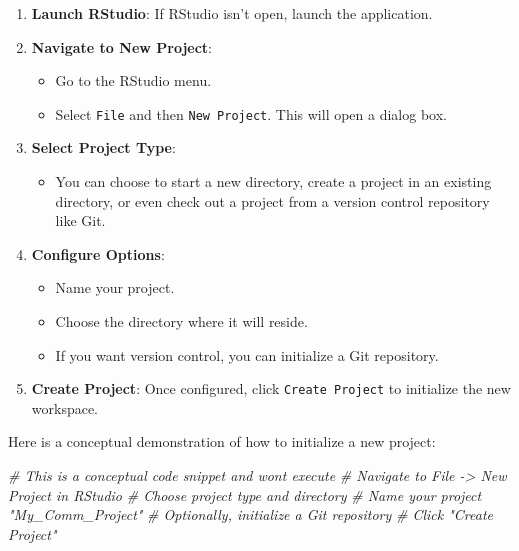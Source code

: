 \documentclass[
]{book}
\newenvironment{Shaded}{\begin{snugshade}}{\end{snugshade}}
\newcommand{\CommentTok}[1]{\textcolor[rgb]{0.56,0.35,0.01}{\textit{#1}}}
\providecommand{\tightlist}{%
  \setlength{\itemsep}{0pt}\setlength{\parskip}{0pt}}
\begin{document}
\begin{enumerate}
\def\labelenumi{\arabic{enumi}.}
\item
  \textbf{Launch RStudio}: If RStudio isn't open, launch the application.
\item
  \textbf{Navigate to New Project}:

  \begin{itemize}
  \tightlist
  \item
    Go to the RStudio menu.
  \item
    Select \texttt{File} and then \texttt{New\ Project}. This will open a dialog box.
  \end{itemize}
\item
  \textbf{Select Project Type}:

  \begin{itemize}
  \tightlist
  \item
    You can choose to start a new directory, create a project in an existing directory, or even check out a project from a version control repository like Git.
  \end{itemize}
\item
  \textbf{Configure Options}:

  \begin{itemize}
  \tightlist
  \item
    Name your project.
  \item
    Choose the directory where it will reside.
  \item
    If you want version control, you can initialize a Git repository.
  \end{itemize}
\item
  \textbf{Create Project}: Once configured, click \texttt{Create\ Project} to initialize the new workspace.
\end{enumerate}

Here is a conceptual demonstration of how to initialize a new project:

\begin{Shaded}
\begin{Highlighting}[]
\CommentTok{\# This is a conceptual code snippet and won\textquotesingle{}t execute}
\CommentTok{\# Navigate to File {-}\textgreater{} New Project in RStudio}
\CommentTok{\# Choose project type and directory}
\CommentTok{\# Name your project "My\_Comm\_Project"}
\CommentTok{\# Optionally, initialize a Git repository}
\CommentTok{\# Click "Create Project"}
\end{Highlighting}
\end{Shaded}
\end{document}
